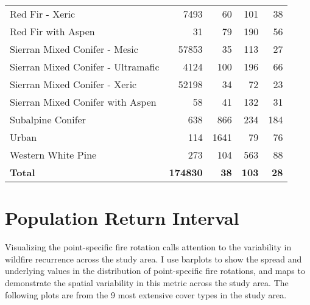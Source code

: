 \begin{table}[!htbp]
\begin{tabular}{@{}lrrrr@{}}
Red Fir - Xeric                              & 7493     &   60      & 101      &  38 \\
Red Fir with Aspen                           & 31       &   79      & 190      &  56 \\
Sierran Mixed Conifer - Mesic                & 57853    &   35      & 113      &  27 \\
Sierran Mixed Conifer - Ultramafic           & 4124     &  100      & 196      &  66 \\
Sierran Mixed Conifer - Xeric                & 52198    &   34      &  72      &  23 \\
Sierran Mixed Conifer with Aspen             & 58       &   41      & 132      &  31 \\
Subalpine Conifer                            & 638      &  866      & 234      & 184 \\
Urban                                        & 114      & 1641      &  79      &  76 \\
Western White Pine                           & 273      &  104      & 563      &  88 \\
\textbf{Total}       			& \textbf{174830}    & \textbf{38}   & \textbf{103}   & \textbf{28}                                                                                \\ \bottomrule
\end{tabular}
\end{table}



\section{Population Return Interval}

Visualizing the point-specific fire rotation calls attention to the variability in wildfire recurrence across the study area. I use barplots to show the spread and underlying values in the distribution of point-specific fire rotations, and maps to demonstrate the spatial variability in this metric across the study area. The following plots are from the 9 most extensive cover types in the study area.


